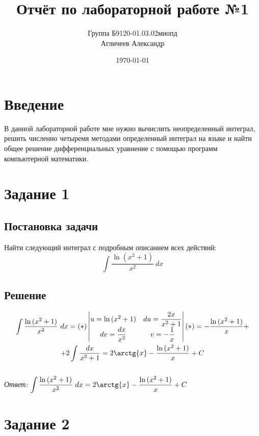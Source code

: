 \documentclass[a4paper, 14pt, titlepage, fleqn]{extarticle}
\author {
	Группа Б9120-01.03.02миопд\\
	Агличеев Александр
}
\title {
	Отчёт по лабораторной работе №1
}
\date {
	\today
}
\begin{document}
	\maketitle
	\tableofcontents
	\pagebreak	

	\section*{Введение}
		В данной лабораторной работе мне нужно вычислить неопределенный интеграл, решить численно четыремя методами определенный интеграл на языке  и найти общее решение дифференциальных уравнение с помощью программ компьютерной математики.
	
	\pagebreak
	\section*{Задание 1}
		\subsection*{Постановка задачи}
			\noindent Найти следующий интеграл с подробным описанием всех действий:
			\[\int \frac {\ln{(x^2+1)}} {x^2} \ dx\]
	
		\subsection*{Решение}
			\begin{gather*}
				\int \frac {\ln{(x^2+1)}} {x^2} \ dx = 
				(*)\begin{vmatrix}
					u = \ln{(x^2+1)} & du = \dfrac{2x}{x^2+1} \\
					dv = \dfrac{dx}{x^2} & v = -\dfrac{1}{x}
				\end{vmatrix}(*)
				= -\dfrac{\ln{(x^2+1)}}{x} + \\ 
				+ 2\int \dfrac{dx}{x^2+1} =  2\arctg{x} - \dfrac{\ln{(x^2+1)}}{x} + C
			\end{gather*}\\
	
			\textit{Ответ:} \( \displaystyle \int \frac {\ln{(x^2+1)}} {x^2} \ dx =2\arctg{x} - \frac{\ln{(x^2+1)}}{x} + C \)

	\pagebreak
	\section*{Задание 2}
\end{document}
